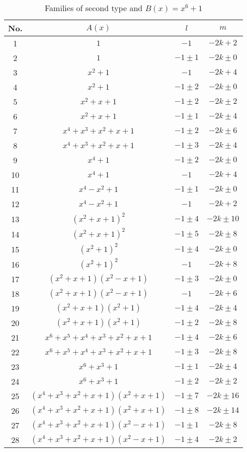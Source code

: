\documentclass{amsart}
\begin{document}
\begin{table}[ht]
\caption{Families of second type and $B(x)=x^6+1$}
\centering
\begin{tabular}{|c |c |c |c |}
\hline
No. & $A(x)$ & $l$ & $m$\\
\hline
1 & $1$ & $-1$ & $-2k+2$  \\
2 & $1$ & $-1\pm1$ & $-2k\pm0$  \\
3 & $x^2+1$ & $-1$ & $-2k+4$  \\
4 & $x^2+1$ & $-1\pm2$ & $-2k\pm0$  \\
5 & $x^2+x+1$ & $-1\pm2$ & $-2k\pm2$  \\
6 & $x^2+x+1$ & $-1\pm1$ & $-2k\pm4$  \\
7 & $x^4+x^3+x^2+x+1$ & $-1\pm2$ & $-2k\pm6$  \\
8 & $x^4+x^3+x^2+x+1$ & $-1\pm3$ & $-2k\pm4$  \\
9 & $x^4+1$ & $-1\pm2$ & $-2k\pm0$  \\
10 & $x^4+1$ & $-1$ & $-2k+4$  \\
11 & $x^4-x^2+1$ & $-1\pm1$ & $-2k\pm0$  \\
12 & $x^4-x^2+1$ & $-1$ & $-2k+2$  \\
13 & $(x^2+x+1)^2$ & $-1\pm4$ & $-2k\pm10$  \\
14 & $(x^2+x+1)^2$ & $-1\pm5$ & $-2k\pm8$  \\
15 & $(x^2+1)^2$ & $-1\pm4$ & $-2k\pm0$  \\
16 & $(x^2+1)^2$ & $-1$ & $-2k+8$  \\
17 & $(x^2+x+1)(x^2-x+1)$ & $-1\pm3$ & $-2k\pm0$  \\
18 & $(x^2+x+1)(x^2-x+1)$ & $-1$ & $-2k+6$  \\
19 & $(x^2+x+1)(x^2+1)$ & $-1\pm4$ & $-2k\pm4$  \\
20 & $(x^2+x+1)(x^2+1) $ & $-1\pm2$ & $-2k\pm8$  \\
21 & $x^6+x^5+x^4+x^3+x^2+x+1$ & $-1\pm4$ & $-2k\pm6$  \\
22 & $x^6+x^5+x^4+x^3+x^2+x+1$ & $-1\pm3$ & $-2k\pm8$  \\
23 & $x^6+x^3+1$ & $-1\pm1$ & $-2k\pm4$  \\
24 & $x^6+x^3+1$ & $-1\pm2$ & $-2k\pm2$  \\
25 & $(x^4+x^3+x^2+x+1)(x^2+x+1)$ & $-1\pm7$ & $-2k\pm16$  \\
26 & $(x^4+x^3+x^2+x+1)(x^2+x+1)$ & $-1\pm8$ & $-2k\pm14$  \\
27 & $(x^4+x^3+x^2+x+1)(x^2-x+1)$ & $-1\pm1$ & $-2k\pm8$  \\
28 & $(x^4+x^3+x^2+x+1)(x^2-x+1)$ & $-1\pm4$ & $-2k\pm2$  \\

\end{tabular}
\end{table}
\end{document}
